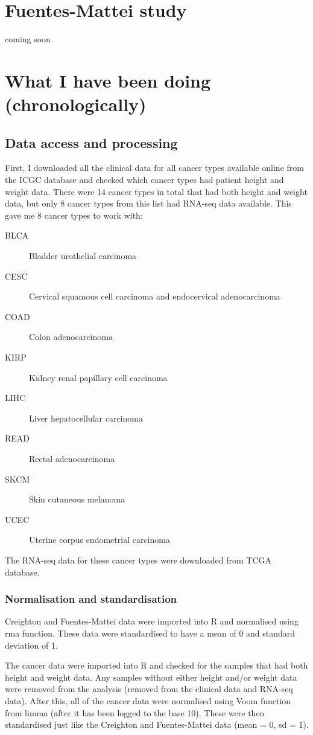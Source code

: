 \documentclass[a4paper, 11pt]{article}
\begin{document}
\section*{Fuentes-Mattei study}

coming soon


\section*{What I have been doing (chronologically)}

\subsection*{Data access and processing}

First, I downloaded all the clinical data for all cancer types available online from the ICGC database and checked which cancer types had patient height and weight data.
There were 14 cancer types in total that had both height and weight data, but only 8 cancer types from this list had RNA-seq data available.
This gave me 8 cancer types to work with:
\begin{description}
	\item[BLCA] Bladder urothelial carcinoma
	\item[CESC] Cervical squamous cell carcinoma and endocervical adenocarcinoma
	\item[COAD] Colon adenocarcinoma
	\item[KIRP] Kidney renal papillary cell carcinoma
	\item[LIHC] Liver hepatocellular carcinoma
	\item[READ] Rectal adenocarcinoma
	\item[SKCM] Skin cutaneous melanoma
	\item[UCEC] Uterine corpus endometrial carcinoma
\end{description}

The RNA-seq data for these cancer types were downloaded from TCGA database.

\subsubsection*{Normalisation and standardisation}

Creighton and Fuentes-Mattei data were imported into R and normalised using rma function.
These data were standardised to have a mean of 0 and standard deviation of 1.

The cancer data were imported into R and checked for the samples that had both height and weight data.
Any samples without either height and/or weight data were removed from the analysis (removed from the clinical data and RNA-seq data).
After this, all of the cancer data were normalised using Voom function  from limma (after it has been logged to the base 10).
These were then standardised just like the Creighton and Fuentes-Mattei data (mean = 0, sd = 1).
\end{document}

